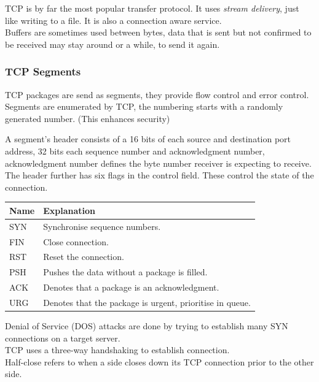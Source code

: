 \documentclass[11pt,a4paper,twoside]{book}
\begin{document}
TCP is by far the most popular transfer protocol. It uses \textit{stream delivery}, just like writing to a file. It is also a connection aware service.\\

Buffers are sometimes used between bytes, data that is sent but not confirmed to be received may stay around or a while, to send it again.\\

\subsubsection{TCP Segments}

TCP packages are send as segments, they provide flow control and error control. Segments are enumerated by TCP, the numbering starts with a randomly generated number. (This enhances security)

A segment's header consists of a 16 bits of each source and destination port address, 32 bits each sequence number and acknowledgment number, acknowledgment number defines the byte number receiver is expecting to receive.\\

The header further has six flags in the control field. These control the state of the connection. \\

\begin{table}
\begin{tabular}{ll}
\toprule
Name & Explanation \\
\midrule
SYN & Synchronise sequence numbers.\\
FIN & Close connection.\\
RST & Reset the connection.\\
PSH & Pushes the data without a package is filled.\\
ACK & Denotes that a package is an acknowledgment.\\
URG & Denotes that the package is urgent, prioritise in queue.\\
\bottomrule
\end{tabular}
\end{table}

Denial of Service (DOS) attacks are done by trying to establish many SYN connections on a target server.\\

TCP uses a three-way handshaking to establish connection.\\

Half-close refers to when a side closes down its TCP connection prior to the other side.
\end{document}

